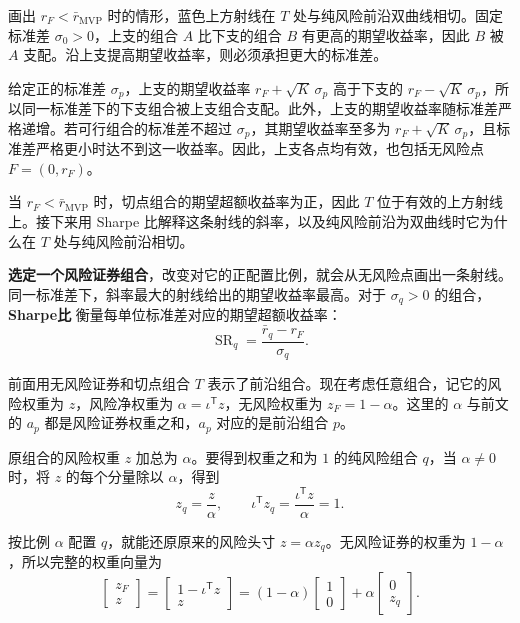  画出 $r_F<\bar r_{\mathrm{MVP}}$ 时的情形，蓝色上方射线在 $T$ 处与纯风险前沿双曲线相切。固定标准差 $\sigma_0>0$，上支的组合 $A$ 比下支的组合 $B$ 有更高的期望收益率，因此 $B$ 被 $A$ 支配。沿上支提高期望收益率，则必须承担更大的标准差。

\begin{center}
\begin{minipage}{\linewidth}
\centering
\renewcommand{\thewjFigure}{\thechapter.S\arabic{wjFigure}}%
%
\par
{}
\end{minipage}
\end{center}

\begin{solution}[label-content={证明},blank-type=none]
给定正的标准差 $\sigma_p$，上支的期望收益率 $r_F+\sqrt K\,\sigma_p$ 高于下支的 $r_F-\sqrt K\,\sigma_p$，所以同一标准差下的下支组合被上支组合支配。此外，上支的期望收益率随标准差严格递增。若可行组合的标准差不超过 $\sigma_p$，其期望收益率至多为 $r_F+\sqrt K\,\sigma_p$，且标准差严格更小时达不到这一收益率。因此，上支各点均有效，也包括无风险点 $F=(0,r_F)$。
\end{solution}

当 $r_F<\bar r_{\mathrm{MVP}}$ 时，切点组合的期望超额收益率为正，因此 $T$ 位于有效的上方射线上。接下来用 Sharpe 比解释这条射线的斜率，以及纯风险前沿为双曲线时它为什么在 $T$ 处与纯风险前沿相切。

\textbf{选定一个风险证券组合}，改变对它的正配置比例，就会从无风险点画出一条射线。同一标准差下，斜率最大的射线给出的期望收益率最高。对于 $\sigma_q>0$ 的组合，\textbf{Sharpe比 } 衡量每单位标准差对应的期望超额收益率：
\[
 \operatorname{SR}_q=\frac{\bar r_q-r_F}{\sigma_q}.
\]

前面用无风险证券和切点组合 $T$ 表示了前沿组合。现在考虑任意组合，记它的风险权重为 $z$，风险净权重为 $\alpha=\iota^{\mathsf T}z$，无风险权重为 $z_F=1-\alpha$。这里的 $\alpha$ 与前文的 $a_p$ 都是风险证券权重之和，$a_p$ 对应的是前沿组合 $p$。

原组合的风险权重 $z$ 加总为 $\alpha$。要得到权重之和为 $1$ 的纯风险组合 $q$，当 $\alpha\ne0$ 时，将 $z$ 的每个分量除以 $\alpha$，得到
\[
 z_q=\frac{z}{\alpha},\qquad
 \iota^{\mathsf T}z_q=\frac{\iota^{\mathsf T}z}{\alpha}=1.
\]

按比例 $\alpha$ 配置 $q$，就能还原原来的风险头寸 $z=\alpha z_q$。无风险证券的权重为 $1-\alpha$，所以完整的权重向量为
\[
 \begin{bmatrix}z_F\\z\end{bmatrix}=\begin{bmatrix}1-\iota^{\mathsf T}z\\z\end{bmatrix}
 =(1-\alpha)\begin{bmatrix}1\\0\end{bmatrix}
  +\alpha\begin{bmatrix}0\\z_q\end{bmatrix}.
\]

